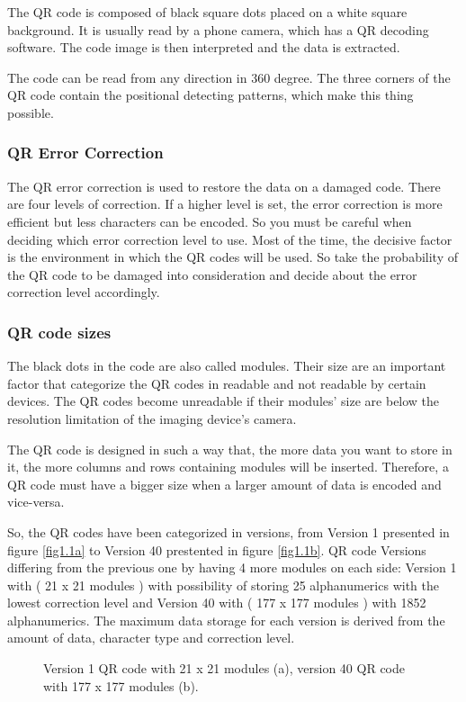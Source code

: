 The QR code is  composed of black square dots placed on a white square background. It is usually read by a phone camera, which has a QR decoding software. The code image is then interpreted and the data is extracted.

The code can be read from any direction in 360 degree. The three corners of the QR code contain the positional detecting patterns, which make this thing possible.

\subsubsection{QR Error Correction}
The QR error correction is used to restore the data on a damaged code. There are four levels of correction. If a higher level is set, the error correction is more efficient but less characters can be encoded. So you must be careful when deciding which error correction level to use. Most of the time, the decisive factor is the environment in which the QR codes will be used. So take the probability of the QR code to be damaged into consideration and decide about the error correction level accordingly.

\subsubsection{QR code sizes}
The black dots in the code are also called modules. Their size are an important factor that categorize the QR codes in readable and not readable by certain devices. The QR codes become unreadable if their modules’ size are below the resolution limitation of the imaging device’s camera.

The QR code is designed in such a way that, the more data you want to store in it, the more columns and rows containing modules will be inserted. Therefore, a QR code must have a bigger size when a larger amount of data is encoded and vice-versa.

So, the QR codes have been categorized in versions, from Version 1 presented in figure \ref{fig1.1a} to Version 40 prestented in figure \ref{fig1.1b}.  QR code Versions differing from the previous one by having 4 more modules on each side: Version 1 with ( 21 x 21 modules ) with possibility of storing 25 alphanumerics with the lowest correction level and Version 40 with  ( 177 x 177 modules ) with 1852 alphanumerics. The maximum data storage for each version is derived from the amount of data, character type and correction level.


\begin{figure}[!ht]
  \centering
 \hspace{0.09cm}
  \caption{Version 1 QR code with 21 x 21 modules (a), version 40 QR code with 177 x 177 modules (b).}
  \label{fig1.1}
\end{figure}


